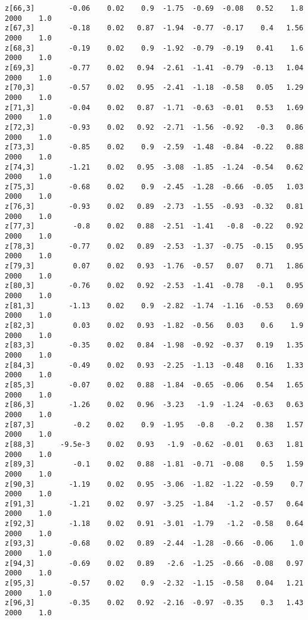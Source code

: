 \documentclass[11pt]{article}
\begin{document}
\begin{Verbatim}[commandchars=\\\{\}]
z[66,3]        -0.06    0.02    0.9  -1.75  -0.69  -0.08   0.52    1.8   2000    1.0
z[67,3]        -0.18    0.02   0.87  -1.94  -0.77  -0.17    0.4   1.56   2000    1.0
z[68,3]        -0.19    0.02    0.9  -1.92  -0.79  -0.19   0.41    1.6   2000    1.0
z[69,3]        -0.77    0.02   0.94  -2.61  -1.41  -0.79  -0.13   1.04   2000    1.0
z[70,3]        -0.57    0.02   0.95  -2.41  -1.18  -0.58   0.05   1.29   2000    1.0
z[71,3]        -0.04    0.02   0.87  -1.71  -0.63  -0.01   0.53   1.69   2000    1.0
z[72,3]        -0.93    0.02   0.92  -2.71  -1.56  -0.92   -0.3   0.86   2000    1.0
z[73,3]        -0.85    0.02    0.9  -2.59  -1.48  -0.84  -0.22   0.88   2000    1.0
z[74,3]        -1.21    0.02   0.95  -3.08  -1.85  -1.24  -0.54   0.62   2000    1.0
z[75,3]        -0.68    0.02    0.9  -2.45  -1.28  -0.66  -0.05   1.03   2000    1.0
z[76,3]        -0.93    0.02   0.89  -2.73  -1.55  -0.93  -0.32   0.81   2000    1.0
z[77,3]         -0.8    0.02   0.88  -2.51  -1.41   -0.8  -0.22   0.92   2000    1.0
z[78,3]        -0.77    0.02   0.89  -2.53  -1.37  -0.75  -0.15   0.95   2000    1.0
z[79,3]         0.07    0.02   0.93  -1.76  -0.57   0.07   0.71   1.86   2000    1.0
z[80,3]        -0.76    0.02   0.92  -2.53  -1.41  -0.78   -0.1   0.95   2000    1.0
z[81,3]        -1.13    0.02    0.9  -2.82  -1.74  -1.16  -0.53   0.69   2000    1.0
z[82,3]         0.03    0.02   0.93  -1.82  -0.56   0.03    0.6    1.9   2000    1.0
z[83,3]        -0.35    0.02   0.84  -1.98  -0.92  -0.37   0.19   1.35   2000    1.0
z[84,3]        -0.49    0.02   0.93  -2.25  -1.13  -0.48   0.16   1.33   2000    1.0
z[85,3]        -0.07    0.02   0.88  -1.84  -0.65  -0.06   0.54   1.65   2000    1.0
z[86,3]        -1.26    0.02   0.96  -3.23   -1.9  -1.24  -0.63   0.63   2000    1.0
z[87,3]         -0.2    0.02    0.9  -1.95   -0.8   -0.2   0.38   1.57   2000    1.0
z[88,3]      -9.5e-3    0.02   0.93   -1.9  -0.62  -0.01   0.63   1.81   2000    1.0
z[89,3]         -0.1    0.02   0.88  -1.81  -0.71  -0.08    0.5   1.59   2000    1.0
z[90,3]        -1.19    0.02   0.95  -3.06  -1.82  -1.22  -0.59    0.7   2000    1.0
z[91,3]        -1.21    0.02   0.97  -3.25  -1.84   -1.2  -0.57   0.64   2000    1.0
z[92,3]        -1.18    0.02   0.91  -3.01  -1.79   -1.2  -0.58   0.64   2000    1.0
z[93,3]        -0.68    0.02   0.89  -2.44  -1.28  -0.66  -0.06    1.0   2000    1.0
z[94,3]        -0.69    0.02   0.89   -2.6  -1.25  -0.66  -0.08   0.97   2000    1.0
z[95,3]        -0.57    0.02    0.9  -2.32  -1.15  -0.58   0.04   1.21   2000    1.0
z[96,3]        -0.35    0.02   0.92  -2.16  -0.97  -0.35    0.3   1.43   2000    1.0

\end{Verbatim}
\end{document}
